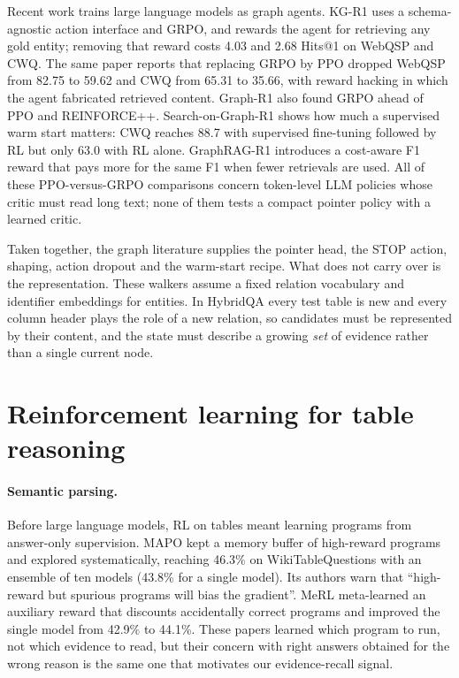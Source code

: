 Recent work trains large language models as graph agents. KG-R1 \citep{lin2025kgr1} uses a schema-agnostic action interface and GRPO, and rewards the agent for retrieving any gold entity; removing that reward costs 4.03 and 2.68 Hits@1 on WebQSP and CWQ. The same paper reports that replacing GRPO by PPO dropped WebQSP from 82.75 to 59.62 and CWQ from 65.31 to 35.66, with reward hacking in which the agent fabricated retrieved content. Graph-R1 \citep{luo2026graphr1} also found GRPO ahead of PPO and REINFORCE++. Search-on-Graph-R1 \citep{sun2026sogr1} shows how much a supervised warm start matters: CWQ reaches 88.7 with supervised fine-tuning followed by RL but only 63.0 with RL alone. GraphRAG-R1 \citep{yu2026graphragr1} introduces a cost-aware F1 reward that pays more for the same F1 when fewer retrievals are used. All of these PPO-versus-GRPO comparisons concern token-level LLM policies whose critic must read long text; none of them tests a compact pointer policy with a learned critic.

Taken together, the graph literature supplies the pointer head, the STOP action, shaping, action dropout and the warm-start recipe. What does not carry over is the representation. These walkers assume a fixed relation vocabulary and identifier embeddings for entities. In HybridQA every test table is new and every column header plays the role of a new relation, so candidates must be represented by their content, and the state must describe a growing \emph{set} of evidence rather than a single current node.

\section{Reinforcement learning for table reasoning}
\label{sec:lit-table}

\paragraph{Semantic parsing.} Before large language models, RL on tables meant learning programs from answer-only supervision. MAPO \citep{liang2018mapo} kept a memory buffer of high-reward programs and explored systematically, reaching 46.3\% on WikiTableQuestions with an ensemble of ten models (43.8\% for a single model). Its authors warn that ``high-reward but spurious programs will bias the gradient''. MeRL \citep{agarwal2019merl} meta-learned an auxiliary reward that discounts accidentally correct programs and improved the single model from 42.9\% to 44.1\%. These papers learned which program to run, not which evidence to read, but their concern with right answers obtained for the wrong reason is the same one that motivates our evidence-recall signal.

